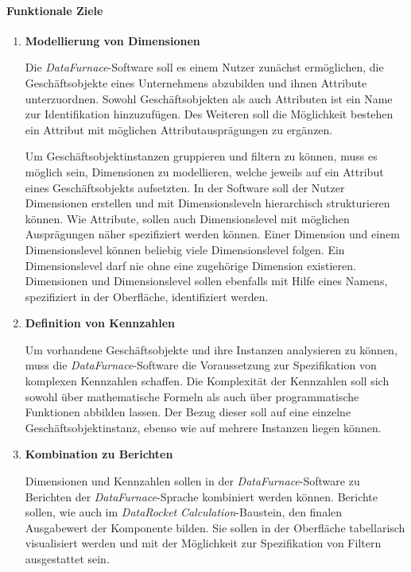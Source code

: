 \documentclass[
  language=german, %
  type=bachelor%
]{isthesis}
\begin{document}
\begin{content}

  \paragraph{Funktionale Ziele}
  \begin{enumerate}
    \item \textbf{Modellierung von Dimensionen}

      Die \textit{DataFurnace}-Software soll es einem Nutzer zunächst
      ermöglichen, die Geschäftsobjekte eines Unternehmens abzubilden und ihnen
      Attribute unterzuordnen. Sowohl Geschäftsobjekten als auch Attributen
      ist ein Name zur Identifikation hinzuzufügen. Des Weiteren soll die
      Möglichkeit bestehen ein Attribut mit möglichen Attributausprägungen zu
      ergänzen.

      Um Geschäftsobjektinstanzen gruppieren und filtern zu können, muss es
      möglich sein, Dimensionen zu modellieren, welche jeweils auf ein Attribut
      eines Geschäftsobjekts aufsetzten. In der Software soll der Nutzer
      Dimensionen erstellen und mit Dimensionsleveln hierarchisch strukturieren
      können. Wie Attribute, sollen auch Dimensionslevel mit möglichen
      Ausprägungen näher spezifiziert werden können. Einer Dimension und einem
      Dimensionslevel können beliebig viele Dimensionslevel folgen. Ein
      Dimensionslevel darf nie ohne eine zugehörige Dimension existieren.
      Dimensionen und Dimensionslevel sollen ebenfalls mit Hilfe eines Namens,
      spezifiziert in der Oberfläche, identifiziert werden.

    \item \textbf{Definition von Kennzahlen}

      Um vorhandene Geschäftsobjekte und ihre Instanzen analysieren zu können,
      muss die \textit{DataFurnace}-Software die Voraussetzung zur
      Spezifikation von komplexen Kennzahlen schaffen. Die Komplexität der
      Kennzahlen soll sich sowohl über mathematische Formeln als auch
      über programmatische Funktionen abbilden lassen. Der Bezug dieser soll auf
      eine einzelne Geschäftsobjektinstanz, ebenso wie auf mehrere Instanzen
      liegen können.

    \item \textbf{Kombination zu Berichten}

      Dimensionen und Kennzahlen sollen in der \textit{DataFurnace}-Software zu
      Berichten der \textit{DataFurnace}-Sprache kombiniert werden können.
      Berichte sollen, wie auch im \textit{DataRocket}
      \textit{Calculation}-Baustein, den finalen Ausgabewert der Komponente
      bilden. Sie sollen in der Oberfläche tabellarisch visualisiert werden und
      mit der Möglichkeit zur Spezifikation von Filtern ausgestattet sein.


\end{enumerate}
\end{content}
\end{document}
